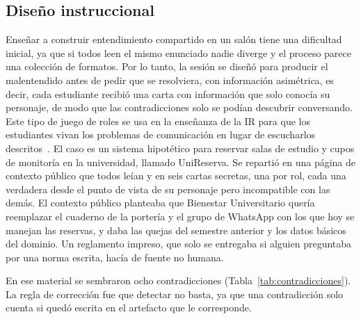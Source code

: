\documentclass[12pt,letterpaper,oneside]{report}
\begin{document}
\subsection{Diseño instruccional}
Enseñar a construir entendimiento compartido en un salón tiene una dificultad inicial, ya
que si todos leen el mismo enunciado nadie diverge y el proceso parece una
colección de formatos. Por lo tanto, la sesión se diseñó para producir el
malentendido antes de
pedir que se resolviera, con información asimétrica, es decir, cada estudiante
recibió una carta con información que solo conocía su personaje, de modo que
las contradicciones solo se podían descubrir conversando. Este tipo de juego de
roles se usa en la enseñanza de la IR para que los estudiantes vivan los
problemas de comunicación en lugar de escucharlos
descritos~\cite{zowghi2003teaching,svensson2017role}. El caso es un sistema hipotético
para reservar salas de estudio y cupos de monitoría en la universidad, llamado
UniReserva. Se repartió en una página de contexto público que todos leían y en
seis cartas secretas, una por rol, cada una verdadera desde el punto de vista de
su personaje pero incompatible con las demás. El contexto público planteaba que
Bienestar Universitario quería reemplazar el cuaderno de la portería y el grupo
de WhatsApp con los que hoy se manejan las reservas, y daba las quejas del
semestre anterior y los datos básicos del dominio. Un reglamento impreso, que
solo se entregaba si alguien preguntaba por una norma escrita, hacía de fuente no
humana.

En ese material se sembraron ocho contradicciones (Tabla~\ref{tab:contradicciones}).
La regla de corrección fue que detectar no basta, ya que una contradicción
solo cuenta si quedó escrita en el artefacto que le corresponde.
\end{document}
